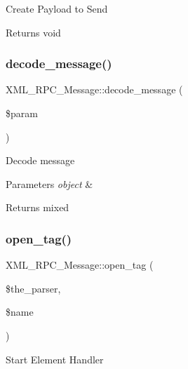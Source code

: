 Create Payload to Send

\begin{DoxyReturn}{Returns}
void 
\end{DoxyReturn}
\mbox{\label{class_x_m_l___r_p_c___message_a52edbc413c7a84ef119f5f4bc2cefde3}} 
\subsubsection{\texorpdfstring{decode\+\_\+message()}{decode\_message()}}
{\footnotesize\ttfamily X\+M\+L\+\_\+\+R\+P\+C\+\_\+\+Message\+::decode\+\_\+message (\begin{DoxyParamCaption}\item[{}]{\$param }\end{DoxyParamCaption})}

Decode message


\begin{DoxyParams}{Parameters}
{\em object} & \\
\hline
\end{DoxyParams}
\begin{DoxyReturn}{Returns}
mixed 
\end{DoxyReturn}
\mbox{\label{class_x_m_l___r_p_c___message_ac0e9546e114f3888784003d49af0ce83}} 
\subsubsection{\texorpdfstring{open\+\_\+tag()}{open\_tag()}}
{\footnotesize\ttfamily X\+M\+L\+\_\+\+R\+P\+C\+\_\+\+Message\+::open\+\_\+tag (\begin{DoxyParamCaption}\item[{}]{\$the\+\_\+parser,  }\item[{}]{\$name }\end{DoxyParamCaption})}

Start Element Handler


